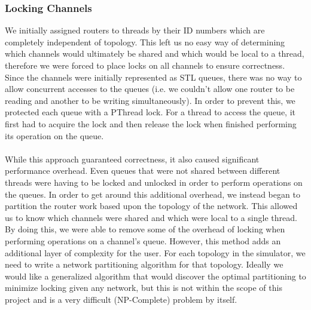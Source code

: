 \documentclass[twocolumn]{article}
\begin{document}
\subsubsection{Locking Channels}
We initially assigned routers to threads by their ID numbers which are completely independent of
topology.  This left us no easy way of determining which channels would
ultimately be shared and which would be local to a thread, therefore we
were forced to place locks on all channels to ensure correctness.  Since
the channels were initially represented as STL queues, there was no way to
allow concurrent accesses to the queues (i.e. we couldn't allow one router
to be reading and another to be writing simultaneously).  In order to
prevent this, we protected each queue with a PThread lock.  For a thread
to access the queue, it first had to acquire the lock and then release the
lock when finished performing its operation on the queue.\\
~\\
While this approach guaranteed correctness, it also caused significant
performance overhead.  Even queues that were not shared between different
threads were having to be locked and unlocked in order to perform
operations on the queues.  In order to get around this additional
overhead, we instead began to partition the router work based upon the
topology of the network.  This allowed us to know which channels
were shared and which were local to a single thread.  By doing this, we
were able to remove some of the overhead of locking when performing
operations on a channel's queue. However, this method adds an additional layer of complexity for the user. For each topology in the simulator, we need to write a network partitioning algorithm for that topology. Ideally we would like a generalized algorithm that would discover the optimal partitioning to minimize locking given any network, but this is not within the scope of this project and is a very difficult (NP-Complete) problem by itself.
\end{document}
